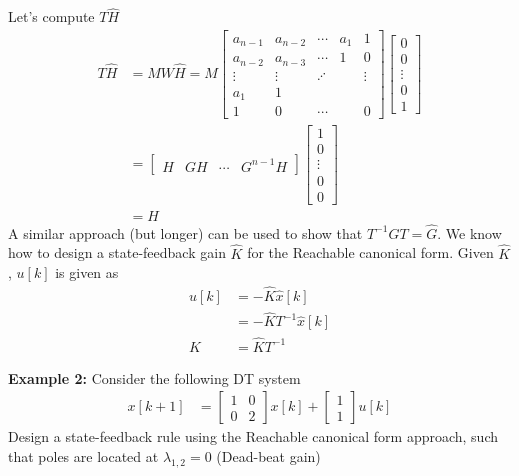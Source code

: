 \documentclass[twoside]{article}
\begin{document}
%
Let's compute $T \hat{H}$
%
\begin{align*}
T \hat{H} &= M W \hat{H} = M 
\left[ \begin{array}{ccccc} a_{n-1} & a_{n-2} & \cdots & a_1 & 1
               \\ 
a_{n-2} & a_{n-3} & \cdots & 1 & 0
\\ \vdots & \vdots & \iddots & & \vdots
\\ a_1 & 1 &  & & 
    \\ 1 & 0 & \cdots &  & 0 \end{array} \right] 
\left[ \begin{array}{c} 0\\ 0 \\ \vdots \\ 0
    \\ 1 \end{array} \right]
\\
&= \left[ \begin{array}{c|c|c|c} H & G H & \cdots & G^{n-1}
                                                    H\end{array}
                                                    \right]
\left[ \begin{array}{c} 1\\ 0 \\ \vdots \\ 0
    \\ 0 \end{array} \right]
\\
&= H
\end{align*}
%
A similar approach (but longer) can be used to show 
that $T^{-1} G T = \hat{G}$. We know how to design a
state-feedback gain $\hat{K}$ for the Reachable
canonical form. Given $\hat{K}$,
$u[k]$ is given as
%
\begin{align*}
  u[k] &= -\hat{K} \hat{x}[k]
\\ 
&= - \hat{K} T^{-1} \hat{x}[k]
\\
K &= \hat{K} T^{-1}
\end{align*}

\textbf{Example 2:} Consider the following DT system
%
\begin{align*}
 x[k+1] &= \left[ \begin{array}{cc} 1 & 0 \\ 0 & 2 \end{array} \right] x[k]
    + \left[ \begin{array}{c} 1 \\ 1 \end{array} \right] u[k]
\end{align*}
% 
Design a state-feedback rule using the Reachable canonical form
approach, such that poles are located at 
$\lambda_{1,2} = 0$ (Dead-beat gain)
\end{document}
